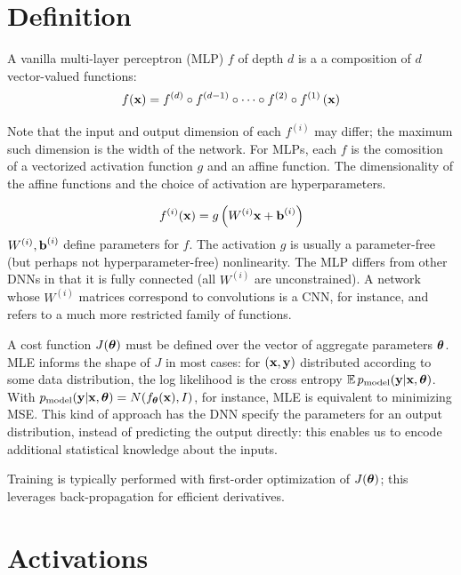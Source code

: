 \documentclass{article}
\begin{document}
\section{Definition}

A vanilla multi-layer perceptron (MLP) $f$ of depth $d$ is a a composition of $d$ vector-valued functions:
$$
f(\textbf{x})=f^{(d)}\circ f^{(d-1)}\circ\cdots\circ f^{(2)}\circ f^{(1)}\left({\textbf{x}}\right)
$$

Note that the input and output dimension of each $f^{(i)}$ may differ; the maximum such dimension is the width of the network. For MLPs, each $f$ is the comosition of a vectorized activation function $g$ and an affine function. The dimensionality of the affine functions and the choice of activation are hyperparameters.

$$
f^{(i)}(\textbf{x})=g\left({W^{(i)}\textbf{x}+\textbf{b}^{(i)}}\right)
$$
$W^{(i)},\textbf{b}^{(i)}$ define parameters for $f$. The activation $g$ is usually a parameter-free (but perhaps not hyperparameter-free) nonlinearity. The MLP differs from other DNNs in that it is fully connected (all $W^{(i)}$ are unconstrained). A network whose $W^{(i)}$ matrices correspond to convolutions is a CNN, for instance, and refers to a much more restricted family of functions.

A cost function $J({\boldsymbol\theta})$ must be defined over the vector of aggregate parameters ${\boldsymbol\theta}$. MLE informs the shape of $J$ in most cases: for $(\textbf{x},\textbf{y})$ distributed according to some data distribution, the log likelihood is the cross entropy $\operatorname{\mathbb{E}} p_\text{model}(\textbf{y}|\textbf{x},{\boldsymbol\theta})$. With $p_\text{model}(\textbf{y}|\textbf{x},{\boldsymbol\theta})=N(f_{\boldsymbol\theta}(\textbf{x}),I)$, for instance, MLE is equivalent to minimizing MSE. This kind of approach has the DNN specify the parameters for an output distribution, instead of predicting the output directly: this enables us to encode additional statistical knowledge about the inputs.

Training is typically performed with first-order optimization of $J({\boldsymbol\theta})$; this leverages back-propagation for efficient derivatives.

\section{Activations}
\end{document}
